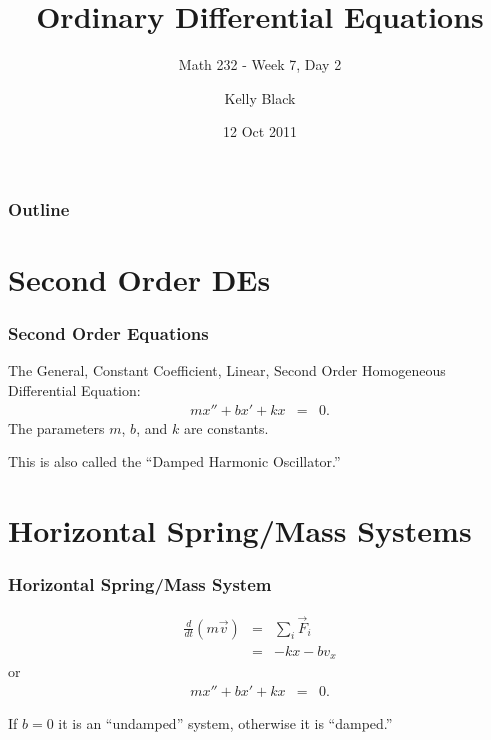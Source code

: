 \documentclass{beamer}
\newcommand{\lp}{\left(}
\newcommand{\rp}{\right)}
\begin{document}
\title{Ordinary Differential Equations}
\subtitle{Math 232 - Week 7, Day 2}

\author{Kelly Black}
\date{12 Oct 2011}

\begin{frame}
  \titlepage
\end{frame}

\begin{frame}
  \frametitle{Outline}
\end{frame}


\section{Second Order DEs}


\begin{frame}
  \frametitle{Second Order Equations}

  The General, Constant Coefficient, Linear, Second Order Homogeneous
  Differential Equation:
  \begin{eqnarray*}
    m x'' + b x' + kx & = & 0.
  \end{eqnarray*}
  The parameters $m$, $b$, and $k$ are constants.

  This is also called the ``Damped Harmonic Oscillator.''

\end{frame}

\section{Horizontal Spring/Mass Systems}

\begin{frame}
  \frametitle{Horizontal Spring/Mass System}

  \begin{eqnarray*}
    \frac{d}{dt} \lp m \vec{v} \rp & = & \sum_i \vec{F}_i \\
    & = & -kx - bv_x 
  \end{eqnarray*}
  or
  \begin{eqnarray*}
    mx'' + bx' + kx & = & 0.
  \end{eqnarray*}

  If $b=0$ it is an ``undamped'' system, otherwise it is ``damped.''

\end{frame}
\end{document}
